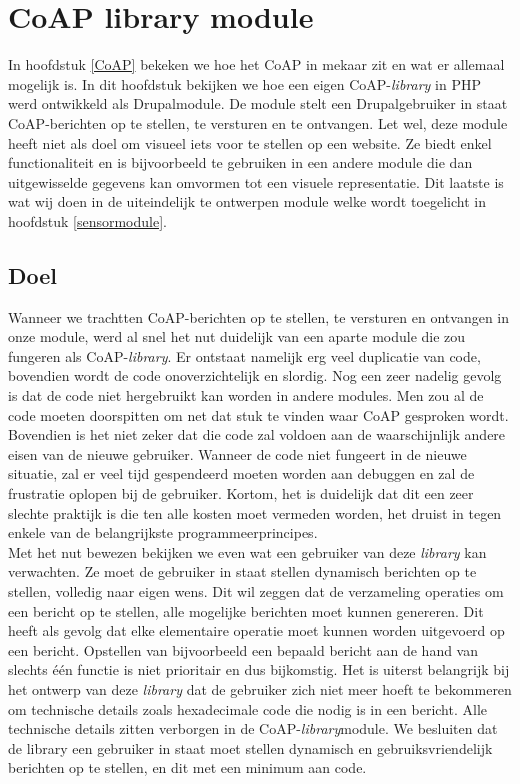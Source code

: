 \chapter{CoAP library module} \label{coaplibrary}

In hoofdstuk \ref{CoAP} bekeken we hoe het CoAP in mekaar zit en wat er allemaal mogelijk is. In dit hoofdstuk bekijken we hoe een eigen CoAP-\textit{library} in PHP werd ontwikkeld als Drupalmodule. De module stelt een Drupalgebruiker in staat CoAP-berichten op te stellen, te versturen en te ontvangen. Let wel, deze module heeft niet als doel om visueel iets voor te stellen op een website. Ze biedt enkel functionaliteit en is bijvoorbeeld te gebruiken in een andere module die dan uitgewisselde gegevens kan omvormen tot een visuele representatie. Dit laatste is wat wij doen in de uiteindelijk te ontwerpen module welke wordt toegelicht in hoofdstuk \ref{sensormodule}.

\section{Doel}

Wanneer we trachtten CoAP-berichten op te stellen, te versturen en ontvangen in onze module, werd al snel het nut duidelijk van een aparte module die zou fungeren als CoAP-\textit{library}. Er ontstaat namelijk erg veel duplicatie van code, bovendien wordt de code onoverzichtelijk en slordig. Nog een zeer nadelig gevolg is dat de code niet hergebruikt kan worden in andere modules. Men zou al de code moeten doorspitten om net dat stuk te vinden waar CoAP gesproken wordt. Bovendien is het niet zeker dat die code zal voldoen aan de waarschijnlijk andere eisen van de nieuwe gebruiker. Wanneer de code niet fungeert in de nieuwe situatie, zal er veel tijd gespendeerd moeten worden aan debuggen en zal de frustratie oplopen bij de gebruiker. Kortom, het is duidelijk dat dit een zeer slechte praktijk is die ten alle kosten moet vermeden worden, het druist in tegen enkele van de belangrijkste programmeerprincipes.\\

\newpage
Met het nut bewezen bekijken we even wat een gebruiker van deze \textit{library} kan verwachten. Ze moet de gebruiker in staat stellen dynamisch berichten op te stellen, volledig naar eigen wens. Dit wil zeggen dat de verzameling operaties om een bericht op te stellen, alle mogelijke berichten moet kunnen genereren. Dit heeft als gevolg dat elke elementaire operatie moet kunnen worden uitgevoerd op een bericht. Opstellen van bijvoorbeeld een bepaald bericht aan de hand van slechts \'{e}\'{e}n functie is niet prioritair en dus bijkomstig. Het is uiterst belangrijk bij het ontwerp van deze \textit{library} dat de gebruiker zich niet meer hoeft te bekommeren om technische details zoals hexadecimale code die nodig is in een bericht. Alle technische details zitten verborgen in de CoAP-\textit{library}module. We besluiten dat de library een gebruiker in staat moet stellen dynamisch en gebruiksvriendelijk berichten op te stellen, en dit met een minimum aan code.

